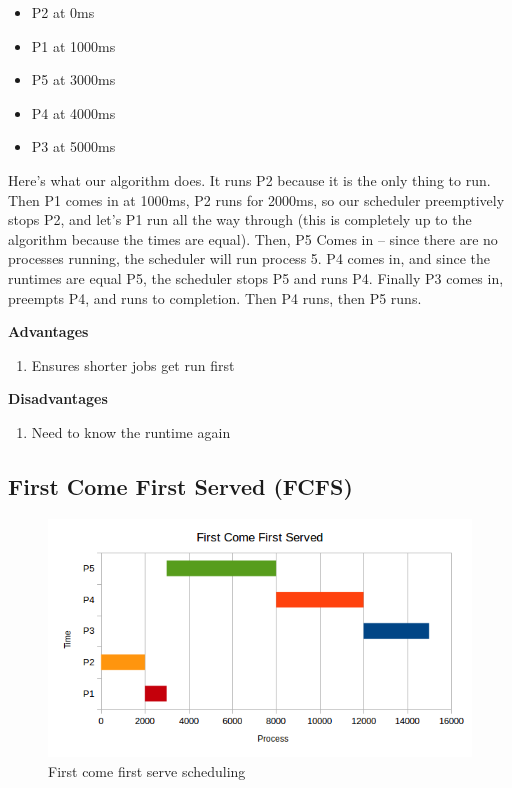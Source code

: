 \begin{itemize}
\tightlist
\item
  P2 at 0ms
\item
  P1 at 1000ms
\item
  P5 at 3000ms
\item
  P4 at 4000ms
\item
  P3 at 5000ms
\end{itemize}

Here's what our algorithm does. It runs P2 because it is the only thing to run. Then P1 comes in at 1000ms, P2 runs for 2000ms, so our scheduler preemptively stops P2, and let's P1 run all the way through (this is completely up to the algorithm because the times are equal). Then, P5 Comes in -- since there are no processes running, the scheduler will run process 5. P4 comes in, and since the runtimes are equal P5, the scheduler stops P5 and runs P4. Finally P3 comes in, preempts P4, and runs to completion. Then P4 runs, then P5 runs.

\textbf{Advantages}

\begin{enumerate}
  \item Ensures shorter jobs get run first
\end{enumerate}

\textbf{Disadvantages}

\begin{enumerate}
  \item Need to know the runtime again
\end{enumerate}

\subsection{First Come First Served (FCFS)}

\begin{figure}[htbp]
\centering
\includegraphics[width=\textwidth]{scheduling/images/fcfs.png}
\caption{First come first serve scheduling}
\end{figure}

